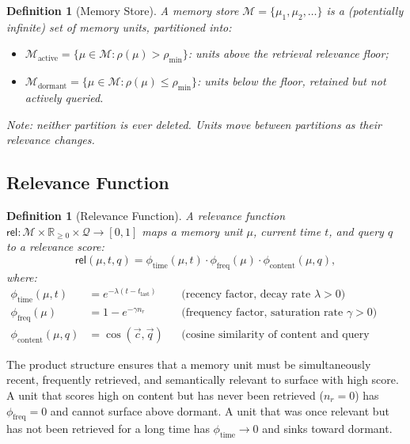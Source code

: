 \documentclass[12pt]{article}
\newtheorem{definition}[theorem]{Definition}
\newcommand{\MEM}{\mathcal{M}}
\newcommand{\REL}{\mathsf{rel}}
\begin{document}
\begin{definition}[Memory Store]
  A \emph{memory store} $\MEM = \{\mu_1, \mu_2, \ldots\}$ is a (potentially
  infinite) set of memory units, partitioned into:
  \begin{itemize}[leftmargin=*]
    \item $\MEM_\text{active} = \{\mu \in \MEM : \rho(\mu) > \rho_\text{min}\}$:
      units above the retrieval relevance floor;
    \item $\MEM_\text{dormant} = \{\mu \in \MEM : \rho(\mu) \le \rho_\text{min}\}$:
      units below the floor, retained but not actively queried.
  \end{itemize}
  Note: neither partition is ever deleted.  Units move between partitions as
  their relevance changes.
\end{definition}

\subsection{Relevance Function}

\begin{definition}[Relevance Function]
  A \emph{relevance function} $\REL : \MEM \times \mathbb{R}_{\ge 0} \times
  \mathcal{Q} \to [0,1]$ maps a memory unit $\mu$, current time $t$, and
  query $q$ to a relevance score:
  \[
    \REL(\mu, t, q) = \phi_\text{time}(\mu, t) \cdot \phi_\text{freq}(\mu) \cdot
    \phi_\text{content}(\mu, q),
  \]
  where:
  \begin{align*}
    \phi_\text{time}(\mu, t)   &= e^{-\lambda (t - t_\text{last})} &&
    \text{(recency factor, decay rate $\lambda > 0$)} \\
    \phi_\text{freq}(\mu)      &= 1 - e^{-\gamma n_r} &&
    \text{(frequency factor, saturation rate $\gamma > 0$)} \\
    \phi_\text{content}(\mu, q) &= \cos(\vec{c}, \vec{q}) &&
    \text{(cosine similarity of content and query embeddings)}
  \end{align*}
\end{definition}

The product structure ensures that a memory unit must be simultaneously recent,
frequently retrieved, and semantically relevant to surface with high score.  A
unit that scores high on content but has never been retrieved ($n_r = 0$) has
$\phi_\text{freq} = 0$ and cannot surface above dormant.  A unit that was once
relevant but has not been retrieved for a long time has $\phi_\text{time} \to 0$
and sinks toward dormant.
\end{document}
